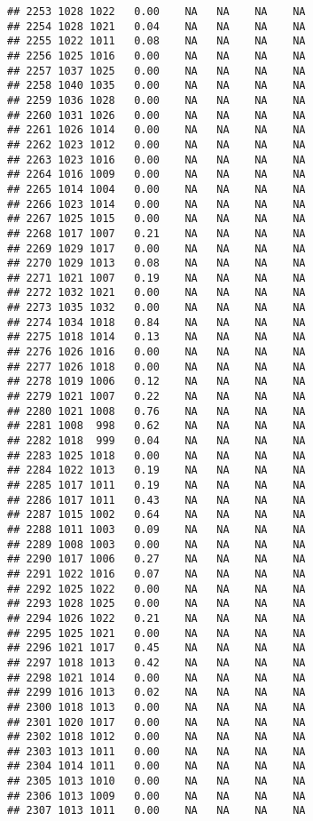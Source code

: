 \documentclass{article}\usepackage{graphicx, color}
\makeatletter
\newenvironment{kframe}{%
 \def\at@end@of@kframe{}%
 \ifinner\ifhmode%
  \def\at@end@of@kframe{\end{minipage}}%
  \begin{minipage}{\columnwidth}%
 \fi\fi%
 \def\FrameCommand##1{\hskip\@totalleftmargin \hskip-\fboxsep
 \colorbox{shadecolor}{##1}\hskip-\fboxsep
     \hskip-\linewidth \hskip-\@totalleftmargin \hskip\columnwidth}%
 \MakeFramed {\advance\hsize-\width
   \@totalleftmargin\z@ \linewidth\hsize
   \@setminipage}}%
 {\par\unskip\endMakeFramed%
 \at@end@of@kframe}
\newenvironment{knitrout}{}{} %
\makeatother
\begin{document}
\begin{knitrout}
\begin{kframe}
\begin{verbatim}
## 2253 1028 1022   0.00    NA   NA    NA    NA
## 2254 1028 1021   0.04    NA   NA    NA    NA
## 2255 1022 1011   0.08    NA   NA    NA    NA
## 2256 1025 1016   0.00    NA   NA    NA    NA
## 2257 1037 1025   0.00    NA   NA    NA    NA
## 2258 1040 1035   0.00    NA   NA    NA    NA
## 2259 1036 1028   0.00    NA   NA    NA    NA
## 2260 1031 1026   0.00    NA   NA    NA    NA
## 2261 1026 1014   0.00    NA   NA    NA    NA
## 2262 1023 1012   0.00    NA   NA    NA    NA
## 2263 1023 1016   0.00    NA   NA    NA    NA
## 2264 1016 1009   0.00    NA   NA    NA    NA
## 2265 1014 1004   0.00    NA   NA    NA    NA
## 2266 1023 1014   0.00    NA   NA    NA    NA
## 2267 1025 1015   0.00    NA   NA    NA    NA
## 2268 1017 1007   0.21    NA   NA    NA    NA
## 2269 1029 1017   0.00    NA   NA    NA    NA
## 2270 1029 1013   0.08    NA   NA    NA    NA
## 2271 1021 1007   0.19    NA   NA    NA    NA
## 2272 1032 1021   0.00    NA   NA    NA    NA
## 2273 1035 1032   0.00    NA   NA    NA    NA
## 2274 1034 1018   0.84    NA   NA    NA    NA
## 2275 1018 1014   0.13    NA   NA    NA    NA
## 2276 1026 1016   0.00    NA   NA    NA    NA
## 2277 1026 1018   0.00    NA   NA    NA    NA
## 2278 1019 1006   0.12    NA   NA    NA    NA
## 2279 1021 1007   0.22    NA   NA    NA    NA
## 2280 1021 1008   0.76    NA   NA    NA    NA
## 2281 1008  998   0.62    NA   NA    NA    NA
## 2282 1018  999   0.04    NA   NA    NA    NA
## 2283 1025 1018   0.00    NA   NA    NA    NA
## 2284 1022 1013   0.19    NA   NA    NA    NA
## 2285 1017 1011   0.19    NA   NA    NA    NA
## 2286 1017 1011   0.43    NA   NA    NA    NA
## 2287 1015 1002   0.64    NA   NA    NA    NA
## 2288 1011 1003   0.09    NA   NA    NA    NA
## 2289 1008 1003   0.00    NA   NA    NA    NA
## 2290 1017 1006   0.27    NA   NA    NA    NA
## 2291 1022 1016   0.07    NA   NA    NA    NA
## 2292 1025 1022   0.00    NA   NA    NA    NA
## 2293 1028 1025   0.00    NA   NA    NA    NA
## 2294 1026 1022   0.21    NA   NA    NA    NA
## 2295 1025 1021   0.00    NA   NA    NA    NA
## 2296 1021 1017   0.45    NA   NA    NA    NA
## 2297 1018 1013   0.42    NA   NA    NA    NA
## 2298 1021 1014   0.00    NA   NA    NA    NA
## 2299 1016 1013   0.02    NA   NA    NA    NA
## 2300 1018 1013   0.00    NA   NA    NA    NA
## 2301 1020 1017   0.00    NA   NA    NA    NA
## 2302 1018 1012   0.00    NA   NA    NA    NA
## 2303 1013 1011   0.00    NA   NA    NA    NA
## 2304 1014 1011   0.00    NA   NA    NA    NA
## 2305 1013 1010   0.00    NA   NA    NA    NA
## 2306 1013 1009   0.00    NA   NA    NA    NA
## 2307 1013 1011   0.00    NA   NA    NA    NA

\end{verbatim}
\end{kframe}
\end{knitrout}
\end{document}
